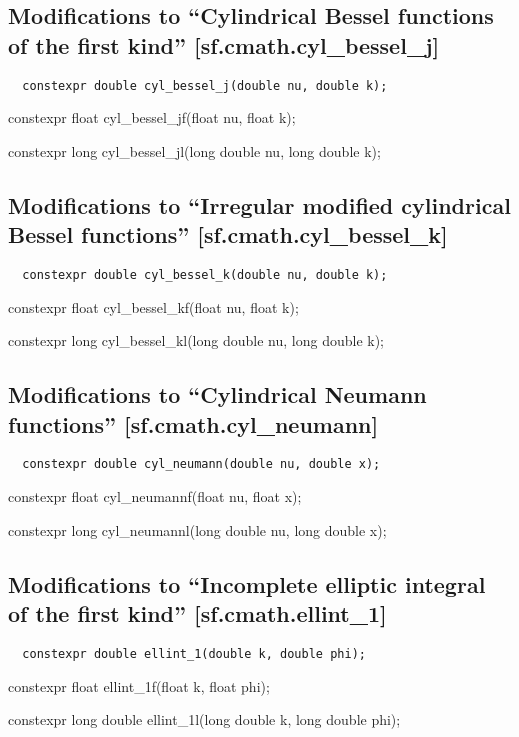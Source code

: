 \documentclass[prd,twocolumn,amsmath,amssymb,nofootinbib,eqsecnum]{revtex4-1}
\newcommand{\code}[1]{{\tt #1}}
\newcommand{\highlight}[1]{{\color{red} #1}}
\newcommand{\bigund}{{\Huge{\_}}}
\begin{document}
\subsection{Modifications to  ``Cylindrical Bessel functions of the first kind''  [sf.cmath.cyl{\bigund}bessel{\bigund}j]}

\code{
	\highlight{constexpr} double cyl\_bessel\_j(double nu, double k);
	
	\highlight{constexpr} float cyl\_bessel\_jf(float nu, float k);
	
	\highlight{constexpr} long cyl\_bessel\_jl(long double nu, long double k);

}

\subsection{Modifications to  ``Irregular modified cylindrical Bessel functions''  [sf.cmath.cyl{\bigund}bessel{\bigund}k]}

\code{
	\highlight{constexpr} double cyl\_bessel\_k(double nu, double k);
	
	\highlight{constexpr} float cyl\_bessel\_kf(float nu, float k);
	
	\highlight{constexpr} long cyl\_bessel\_kl(long double nu, long double k);

}


\subsection{Modifications to  ``Cylindrical Neumann functions''  [sf.cmath.cyl{\bigund}neumann]}

\code{
	\highlight{constexpr} double cyl\_neumann(double nu, double x);
	
	\highlight{constexpr} float cyl\_neumannf(float nu, float x);
	
	\highlight{constexpr} long cyl\_neumannl(long double nu, long double x);

}

\subsection{Modifications to  ``Incomplete elliptic integral of the first kind''  [sf.cmath.ellint{\bigund}1]}

\code{
	\highlight{constexpr} double ellint\_1(double k, double phi);
	
	\highlight{constexpr} float ellint\_1f(float k, float phi);
	
	\highlight{constexpr} long double ellint\_1l(long double k, long double phi);

}
\end{document}
